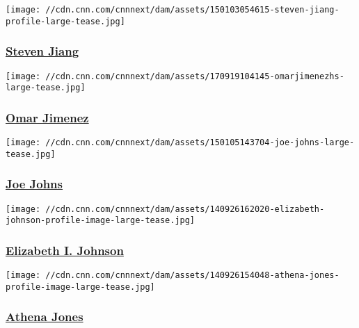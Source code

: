 \href{/profiles/steven-jiang}{}

\texttt{[image: //cdn.cnn.com/cnnnext/dam/assets/150103054615-steven-jiang-profile-large-tease.jpg]}

\hypertarget{steven-jiang}{%
\subsubsection{\texorpdfstring{\href{/profiles/steven-jiang}{Steven
Jiang}}{Steven Jiang}}\label{steven-jiang}}

\href{/profiles/omar-jimenez}{}

\texttt{[image: //cdn.cnn.com/cnnnext/dam/assets/170919104145-omarjimenezhs-large-tease.jpg]}

\hypertarget{omar-jimenez-}{%
\subsubsection{\texorpdfstring{\href{/profiles/omar-jimenez}{Omar
Jimenez }}{Omar Jimenez }}\label{omar-jimenez-}}

\href{/profiles/joe-johns-profile}{}

\texttt{[image: //cdn.cnn.com/cnnnext/dam/assets/150105143704-joe-johns-large-tease.jpg]}

\hypertarget{joe-johns}{%
\subsubsection{\texorpdfstring{\href{/profiles/joe-johns-profile}{Joe
Johns}}{Joe Johns}}\label{joe-johns}}

\href{/profiles/elizabeth-i-johnson}{}

\texttt{[image: //cdn.cnn.com/cnnnext/dam/assets/140926162020-elizabeth-johnson-profile-image-large-tease.jpg]}

\hypertarget{elizabeth-i-johnson}{%
\subsubsection{\texorpdfstring{\href{/profiles/elizabeth-i-johnson}{Elizabeth
I. Johnson}}{Elizabeth I. Johnson}}\label{elizabeth-i-johnson}}

\href{/profiles/athena-jones-profile}{}

\texttt{[image: //cdn.cnn.com/cnnnext/dam/assets/140926154048-athena-jones-profile-image-large-tease.jpg]}

\hypertarget{athena-jones}{%
\subsubsection{\texorpdfstring{\href{/profiles/athena-jones-profile}{Athena
Jones}}{Athena Jones}}\label{athena-jones}}

